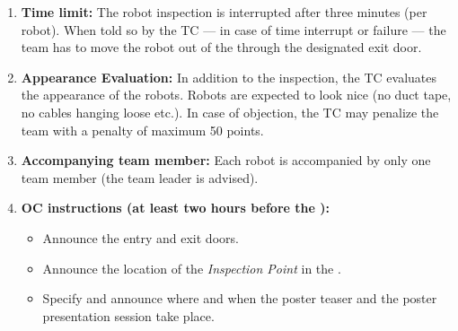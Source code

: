 \begin{enumerate}
	\item \textbf{Time limit:} The robot inspection is interrupted after three minutes (per robot). When told so by the TC --- in case of time interrupt or failure --- the team has to move the robot out of the \Arena{} through the designated exit door.
	\item \textbf{Appearance Evaluation:} In addition to the inspection, the TC evaluates the appearance of the robots. Robots are expected to look nice (no duct tape, no cables hanging loose etc.). In case of objection, the TC may penalize the team with a penalty of maximum 50 points.
	\item \textbf{Accompanying team member:} Each robot is accompanied by only one team member (the team leader is advised).
	\item \textbf{OC instructions (at least two hours before the \RobotInspection):}
	\begin{itemize}
		\item Announce the entry and exit doors.
		\item Announce the location of the \textit{Inspection Point} in the \Arena{}.
		\item Specify and announce where and when the poster teaser and the poster presentation session take place.
	\end{itemize}
\end{enumerate}


